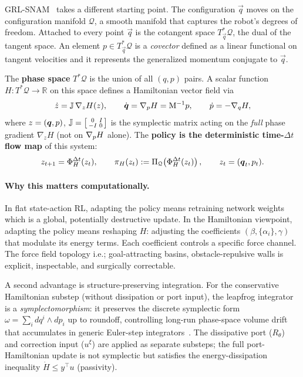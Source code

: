 GRL-SNAM~\citep{ellendula2025grlsnam} takes a different starting point.
The configuration $\vec{q}$ moves on the configuration manifold
$\mathcal{Q}$, a smooth manifold that captures the robot's degrees of
freedom.
Attached to every point $\vec{q}$ is the cotangent space
$T^*_{\vec{q}}\mathcal{Q}$, the dual of the tangent space.
An element $p \in T^*_{\vec{q}}\mathcal{Q}$ is a \emph{covector} defined as a linear functional on tangent velocities and it represents the
generalized momentum conjugate to $\vec{q}$.

The \textbf{phase space} $T^*\mathcal{Q}$ is the union of all
$(q,p)$ pairs.
A scalar function $H : T^*\mathcal{Q} \to \mathbb{R}$ on this space
defines a Hamiltonian vector field via
\begin{equation}
  \dot{z} = \mathbb{J}\,\nabla_z H(z),
  \qquad
  \dot{\boldsymbol{q}} = \nabla_{p} H = \mathrm{M}^{-1}p,
  \qquad
  \dot{p} = -\nabla_{q} H,
  \label{eq:ch3:hamilton}
\end{equation}
where $z = (\boldsymbol{q},p)$,
$\mathbb{J} = \bigl[\begin{smallmatrix}0&I\\-I&0\end{smallmatrix}\bigr]$
is the symplectic matrix acting on the \emph{full} phase gradient $\nabla_z H$
(not on $\nabla_p H$ alone).
The \textbf{policy is the deterministic time-$\Delta t$ flow map} of this system:
\begin{equation}
  z_{t+1} = \Phi^{\Delta t}_H(z_t),
  \qquad
  \pi_H(z_t) := \Pi_{\mathcal{Q}}\!\left(\Phi^{\Delta t}_H(z_t)\right),
  \qquad
  z_t = (\boldsymbol{q}_t, p_t).
  \label{eq:ch3:policy}
\end{equation}

\paragraph{Why this matters computationally.}
In flat state-action RL, adapting the policy means retraining
network weights which is a global, potentially destructive update.
In the Hamiltonian viewpoint, adapting the policy means reshaping
$H$: adjusting the coefficients $(\beta, \{\alpha_i\}, \gamma)$
that modulate its energy terms.
Each coefficient controls a specific force channel.
The force field topology i.e.; goal-attracting basins, obstacle-repulsive
walls is explicit, inspectable, and surgically correctable.

A second advantage is structure-preserving integration.
For the conservative Hamiltonian substep (without dissipation or port
input), the leapfrog integrator is a \emph{symplectomorphism}: it
preserves the discrete symplectic form $\omega = \sum_i dq^i\wedge dp_i$
up to roundoff, controlling long-run phase-space volume drift that
accumulates in generic Euler-step integrators~\citep{reich1996symplectic,hairer2006geometric}.
The dissipative port ($R_\theta$) and correction input ($u^\xi$) are
applied as separate substeps; the full port-Hamiltonian update is not
symplectic but satisfies the energy-dissipation inequality
$\dot{H} \leq y^\top u$ (passivity).

